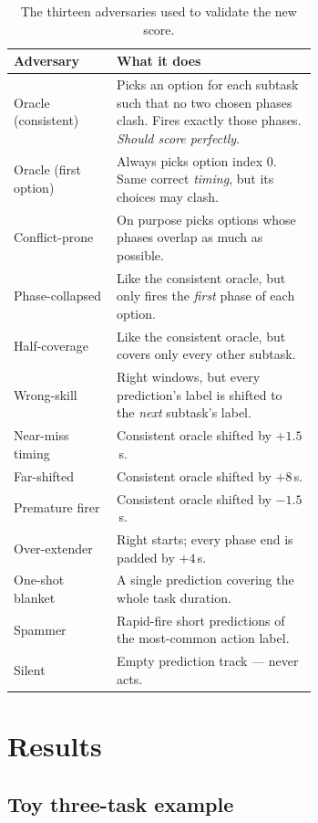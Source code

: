 \documentclass[11pt]{article}
\begin{document}
\begin{table}[ht]
\centering
\small
\begin{tabular}{lp{0.66\linewidth}}
\toprule
\textbf{Adversary} & \textbf{What it does} \\
\midrule
Oracle (consistent)   & Picks an option for each subtask such that no two chosen phases clash. Fires exactly those phases. \emph{Should score perfectly}. \\
Oracle (first option) & Always picks option index 0. Same correct \emph{timing}, but its choices may clash. \\
Conflict-prone        & On purpose picks options whose phases overlap as much as possible. \\
Phase-collapsed       & Like the consistent oracle, but only fires the \emph{first} phase of each option. \\
Half-coverage         & Like the consistent oracle, but covers only every other subtask. \\
Wrong-skill           & Right windows, but every prediction's label is shifted to the \emph{next} subtask's label. \\
Near-miss timing      & Consistent oracle shifted by $+1.5$\,s. \\
Far-shifted           & Consistent oracle shifted by $+8$\,s. \\
Premature firer       & Consistent oracle shifted by $-1.5$\,s. \\
Over-extender         & Right starts; every phase end is padded by $+4$\,s. \\
One-shot blanket      & A single prediction covering the whole task duration. \\
Spammer               & Rapid-fire short predictions of the most-common action label. \\
Silent                & Empty prediction track --- never acts. \\
\bottomrule
\end{tabular}
\caption{The thirteen adversaries used to validate the new score.}
\label{tab:adversaries}
\end{table}

\section{Results}
\label{sec:results}

\subsection{Toy three-task example}
\end{document}
